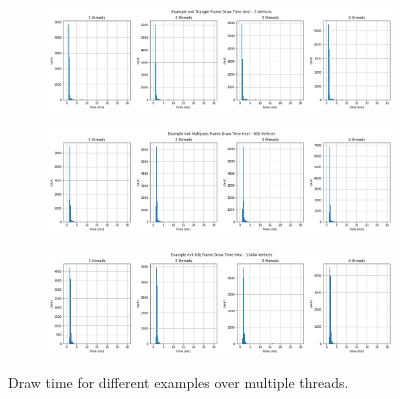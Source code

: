 \documentclass[12pt]{report}
\theoremstyle{definition}
\begin{document}
  \afterpage
  {
    \begin{figure}
      \begin{subfigure}[b]{\textwidth}
        \includegraphics[width=\textwidth]{images/triangle_draw.png}
      \end{subfigure}
      \begin{subfigure}[b]{\textwidth}
        \includegraphics[width=\textwidth]{images/multipass_draw.png}
      \end{subfigure}
      \begin{subfigure}[b]{\textwidth}
        \includegraphics[width=\textwidth]{images/obj_draw.png}
      \end{subfigure}
      \caption{Draw time for different examples over multiple threads.}
      \label{fig:draw}                        
    \end{figure}

    \clearpage

}
\end{document}
